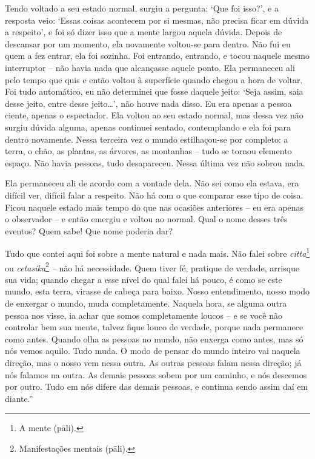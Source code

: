Tendo voltado a seu estado normal, surgiu a pergunta: `Que foi isso?', e
a resposta veio: `Essas coisas acontecem por si mesmas, não precisa
ficar em dúvida a respeito', e foi só dizer isso que a mente largou
aquela dúvida. Depois de descansar por um momento, ela novamente
voltou-se para dentro. Não fui eu quem a fez entrar, ela foi sozinha.
Foi entrando, entrando, e tocou naquele mesmo interruptor -- não havia
nada que alcançasse aquele ponto. Ela permaneceu ali pelo tempo que quis
e então voltou à superfície quando chegou a hora de voltar. Foi tudo
automático, eu não determinei que fosse daquele jeito: `Seja assim, saia
desse jeito, entre desse jeito\ldots{}', não houve nada disso. Eu era
apenas a pessoa ciente, apenas o espectador. Ela voltou ao seu estado
normal, mas dessa vez não surgiu dúvida alguma, apenas continuei
sentado, contemplando e ela foi para dentro novamente. Nessa terceira
vez o mundo estilhaçou-se por completo: a terra, o chão, as plantas, as
árvores, as montanhas -- tudo se tornou elemento espaço. Não havia
pessoas, tudo desapareceu. Nessa última vez não sobrou nada.

Ela permaneceu ali de acordo com a vontade dela. Não sei como ela
estava, era difícil ver, difícil falar a respeito. Não há com o que
comparar esse tipo de coisa. Ficou naquele estado mais tempo do que nas
ocasiões anteriores -- eu era apenas o observador -- e então emergiu e
voltou ao normal. Qual o nome desses três eventos? Quem sabe! Que nome
poderia dar?

Tudo que contei aqui foi sobre a mente natural e nada mais. Não falei
sobre \emph{citta}\footnote{A mente (pāli).} ou
\emph{cetasika}\footnote{Manifestações mentais (pāli).} \emph{--} não há
necessidade. Quem tiver fé, pratique de verdade, arrisque sua vida;
quando chegar a esse nível do qual falei há pouco, é como se este mundo,
esta terra, virasse de cabeça para baixo. Nosso entendimento, nosso modo
de enxergar o mundo, muda completamente. Naquela hora, se alguma outra
pessoa nos visse, ia achar que somos completamente loucos -- e se você
não controlar bem sua mente, talvez fique louco de verdade, porque nada
permanece como antes. Quando olha as pessoas no mundo, não enxerga como
antes, mas só nós vemos aquilo. Tudo muda. O modo de pensar do mundo
inteiro vai naquela direção, mas o nosso vem nessa outra. As outras
pessoas falam nessa direção; já nós falamos na outra. As demais pessoas
sobem por um caminho, e nós descemos por outro. Tudo em nós difere das
demais pessoas, e continua sendo assim daí em diante.''


